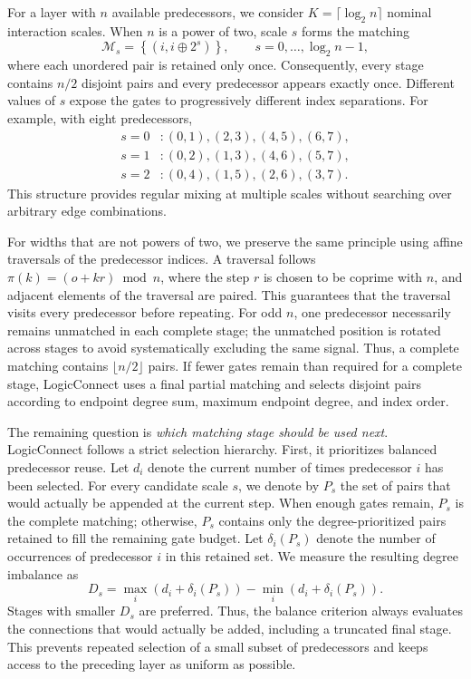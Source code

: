For a layer with $n$ available predecessors, we consider
$K=\lceil\log_2 n\rceil$ nominal interaction scales. When $n$ is a power of
two, scale $s$ forms the matching
%
\begin{equation}
\mathcal{M}_s =
\left\{(i,i\oplus 2^s)\right\},
\qquad
s=0,\ldots,\log_2 n-1,
\label{eq:xor_matching}
\end{equation}
%
where each unordered pair is retained only once. Consequently, every stage
contains $n/2$ disjoint pairs and every predecessor appears exactly once.
Different values of $s$ expose the gates to progressively different index
separations. For example, with eight predecessors,
%
\begin{align*}
s=0 &: (0,1),(2,3),(4,5),(6,7),\\
s=1 &: (0,2),(1,3),(4,6),(5,7),\\
s=2 &: (0,4),(1,5),(2,6),(3,7).
\end{align*}
%
This structure provides regular mixing at multiple scales without searching
over arbitrary edge combinations.

For widths that are not powers of two, we preserve the same principle using
affine traversals of the predecessor indices. A traversal follows
$\pi(k)=(o+kr)\bmod n$, where the step $r$ is chosen to be coprime with $n$,
and adjacent elements of the traversal are paired. This guarantees that the
traversal visits every predecessor before repeating. For odd $n$, one
predecessor necessarily remains unmatched in each complete stage; the
unmatched position is rotated across stages to avoid systematically excluding
the same signal. Thus, a complete matching contains $\lfloor n/2\rfloor$
pairs. If fewer gates remain than required for a complete stage, LogicConnect
uses a final partial matching and selects disjoint pairs according to endpoint
degree sum, maximum endpoint degree, and index order.

The remaining question is \emph{which matching stage should be used next}.
LogicConnect follows a strict selection hierarchy. First, it prioritizes
balanced predecessor reuse. Let $d_i$ denote the current number of times
predecessor $i$ has been selected. For every candidate scale $s$, we denote
by $P_s$ the set of pairs that would actually be appended at the current
step. When enough gates remain, $P_s$ is the complete matching; otherwise,
$P_s$ contains only the degree-prioritized pairs retained to fill the
remaining gate budget. Let $\delta_i(P_s)$ denote the number of occurrences
of predecessor $i$ in this retained set. We measure the resulting degree
imbalance as
%
\begin{equation}
D_s =
\max_i \left(d_i+\delta_i(P_s)\right)
-
\min_i \left(d_i+\delta_i(P_s)\right).
\label{eq:degree_spread}
\end{equation}
%
Stages with smaller $D_s$ are preferred. Thus, the balance criterion always
evaluates the connections that would actually be added, including a
truncated final stage. This prevents repeated selection of a small subset of
predecessors and keeps access to the preceding layer as uniform as possible.

